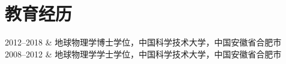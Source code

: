 \section{教育经历}

\begin{EntriesTable}{0.18}{0.02}{0.80}
2012--2018 & 地球物理学博士学位，中国科学技术大学，中国安徽省合肥市 \\
2008--2012 & 地球物理学学士学位，中国科学技术大学，中国安徽省合肥市 \\
\end{EntriesTable}
